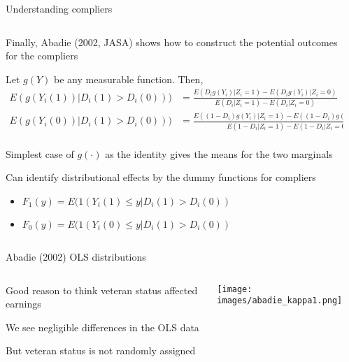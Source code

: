 \documentclass[notes,11pt, aspectratio=169]{beamer}
\newenvironment{wideitemize}{\itemize\addtolength{\itemsep}{10pt}}{\enditemize}
\begin{document}
\begin{frame}{Understanding compliers}
  \begin{columns}[T] %
    \begin{column}{0.9\textwidth}
      \begin{wideitemize}
      \item Finally, Abadie (2002, JASA)  shows how to construct the potential outcomes for the compliers
      \item Let $g(Y)$ be any measurable function. Then,
        \begin{align*}
         E(g(Y_{i}(1)) | D_{i}(1) > D_{i}(0))) &= \frac{E(D_{i}g(Y_{i})|Z_{i} = 1) - E(D_{i}g(Y_{i})|Z_{i} = 0)}{E(D_{i}|Z_{i} = 1) - E(D_{i}|Z_{i}=0)}\\
         E(g(Y_{i}(0)) | D_{i}(1) > D_{i}(0))) &= \frac{E((1-D_{i})g(Y_{i})|Z_{i} = 1) - E((1-D_{i})g(Y_{i})|Z_{i} = 0)}{E(1-D_{i}|Z_{i} = 1) - E(1-D_{i}|Z_{i}=0)}\\
        \end{align*}
      \item Simplest case of $g(\cdot)$ as the identity gives the means for the two marginals
      \item Can identify distributional effects by the
        dummy functions for compliers
        \begin{itemize}
        \item         $F_{1}(y) = E(1(Y_{i}(1) \leq y | D_{i}(1) > D_{i}(0))$
        \item         $F_{0}(y) = E(1(Y_{i}(0) \leq y | D_{i}(1) > D_{i}(0))$
        \end{itemize}
      \end{wideitemize}
\end{column}
\begin{column}{0.3\textwidth}
\end{column}
\end{columns}
\end{frame}

\begin{frame}{Abadie (2002) OLS distributions}
  \begin{columns}[T] %
    \begin{column}{0.3\textwidth}
      \begin{wideitemize}
      \item Good reason to think veteran status affected earnings
      \item We see negligible differences in the OLS data
      \item But veteran status is not randomly assigned
      \end{wideitemize}
\end{column}
\begin{column}{0.7\textwidth}
  \begin{center}
    \texttt{[image: images/abadie\_kappa1.png]}
  \end{center}
\end{column}
\end{columns}
\end{frame}
\end{document}
